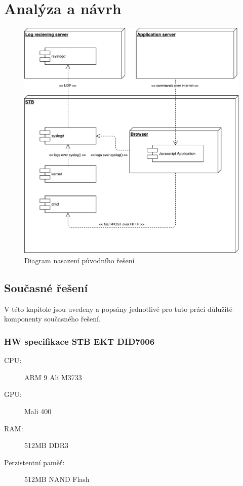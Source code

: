 \documentclass[thesis=B,czech]{FITthesis}[2012/06/26]
\begin{document}
\chapter{Analýza a návrh}
\begin{figure}[H]
	\centering
	\includegraphics[scale=0.5]{images/diagram-nasazeni-puvodniho-reseni}
	\caption[Diagram nasazení původního řešení]{Diagram nasazení původního řešení}
\end{figure}

\section{Současné řešení}
V této kapitole jsou uvedeny a popsány jednotlivé pro tuto práci důlužité komponenty současného řešení.

\subsection{HW specifikace STB EKT DID7006}
\begin{description}
  \item [CPU:] ARM 9 Ali M3733
  \item [GPU:] Mali 400
  \item [RAM:] 512MB DDR3
  \item [Perzistentní paměť:] 512MB NAND Flash
\end{description}
\end{document}
